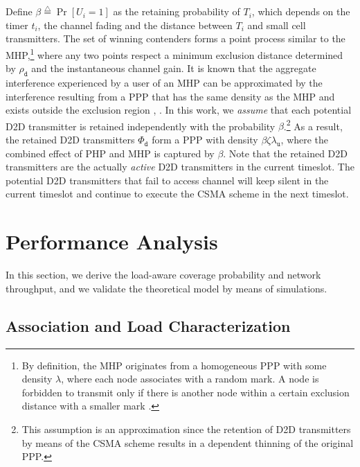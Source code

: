 \documentclass[twocolumn,english]{IEEEtran}
\theoremstyle{plain}
\theoremstyle{definition}
\begin{document}
Define $\beta\overset{\triangle}{=}\Pr[U_{i}=1]$ as the retaining
probability of $T_{i}$, which depends on the timer $t_{i}$, the
channel fading and the distance between $T_{i}$ and small cell transmitters.
The set of winning contenders forms a point process similar to the
MHP,\footnote{By definition, the MHP originates from a homogeneous PPP with some
density $\lambda$, where each node associates with a random mark.
A node is forbidden to transmit only if there is another node within
a certain exclusion distance with a smaller mark \cite{MIIH}. } where any two points respect a minimum exclusion distance determined
by $\rho_{\mathtt{d}}$ and the instantaneous channel gain. It is
known that the aggregate interference experienced by a user of an
MHP can be approximated by the interference resulting from a PPP that
has the same density as the MHP and exists outside the exclusion region
\cite{MIIH}, \cite{AMHC}. In this work, we \textit{\emph{assume}}
that each potential D2D transmitter is retained independently with
the probability $\beta$.\footnote{This assumption is an approximation since the retention of D2D transmitters
by means of the CSMA scheme results in a dependent thinning of the
original PPP.} As a result, the retained D2D transmitters $\Phi_{\mathtt{d}}$ form
a PPP with density $\beta\zeta\lambda_{\mathtt{u}}$, where the combined
effect of PHP and MHP is captured by $\beta$. Note that the retained
D2D transmitters are the actually\emph{ active} D2D transmitters in
the current timeslot. The potential D2D transmitters that fail to
access channel will keep silent in the current timeslot and continue
to execute the CSMA scheme in the next timeslot.


\section{Performance Analysis}

In this section, we derive the load-aware coverage probability and
network throughput, and we validate the theoretical model by means
of simulations.


\subsection{Association and Load Characterization}
\end{document}
